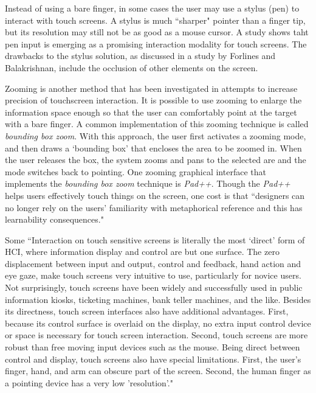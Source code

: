 \documentclass{article}
\begin{document}
Instead of using a bare finger, in some cases the user may use a stylus (pen) to interact with touch screens. A stylus is much ``sharper" pointer than a finger tip, but its resolution may still not be as good as a mouse cursor. A study shows taht pen input is emerging as a promising interaction modality for touch screens.\cite{Bi} The drawbacks to the stylus solution, as discussed in a study by Forlines and Balakrishnan, include the occlusion of other elements on the screen.\cite{Forlines}

Zooming is another method that has been investigated in attempts to increase precision of touchscreen interaction. It is possible to use zooming to enlarge the information space enough so that the user can comfortably point at the target with a bare finger. A common implementation of this zooming technique is called \textit{bounding box zoom}.\cite{Albinsson} With this approach, the user first activates a zooming mode, and then draws a `bounding box' that encloses the area to be zoomed in. When the user releases the box, the system zooms and pans to the selected are and the mode switches back to pointing. One zooming graphical interface that implements the \textit{bounding box zoom} technique is \textit{Pad++}.\cite{Bederson} Though the \textit{Pad++} helps users effectively touch things on the screen, one cost is that ``designers can no longer rely on the users' familiarity with metaphorical reference and this has learnability consequences." \cite{Bederson} 

Some ``Interaction on touch sensitive screens is literally the most `direct' form of HCI, where information display and control are but one surface. The zero displacement between input and output, control and feedback, hand action and eye gaze, make touch screens very intuitive to use, particularly for novice users. Not surprisingly, touch screens have been widely and successfully used in public information kiosks, ticketing machines, bank teller machines, and the like. Besides its directness, touch screen interfaces also have additional advantages. First, because its control surface is overlaid on the display, no extra input control device or space is necessary for touch screen interaction. Second, touch screens are more robust than free moving input devices such as the mouse. Being direct between control and display, touch screens also have special limitations. First, the user's finger, hand, and arm can obscure part of the screen. Second, the human finger as a pointing device has a very low 'resolution'." 
\end{document}
